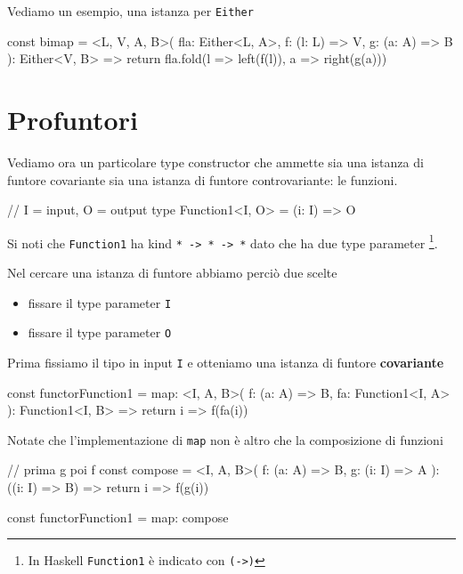 \documentclass[12pt]{article}
\theoremstyle{definition}
\newenvironment{code}
  {\vspace{0.5cm} \VerbatimEnvironment\begin{typescriptcode}}
  {\end{typescriptcode} \vspace{0.2cm}}
\begin{document}
Vediamo un esempio, una istanza per \texttt{Either}

\begin{code}
const bimap = <L, V, A, B>(
  fla: Either<L, A>,
  f: (l: L) => V,
  g: (a: A) => B
): Either<V, B> => {
  return fla.fold(l => left(f(l)), a => right(g(a)))
}
\end{code}

\newpage

\section{Profuntori}

Vediamo ora un particolare type constructor che ammette sia una istanza di funtore covariante sia una istanza di
funtore controvariante: le funzioni.

\begin{code}
// I = input, O = output
type Function1<I, O> = (i: I) => O
\end{code}

Si noti che \texttt{Function1} ha kind \texttt{* -> * -> *} dato che
ha due type parameter \footnote{In Haskell \texttt{Function1} è indicato con \texttt{(->)}}.

Nel cercare una istanza di funtore abbiamo perciò due scelte

\begin{itemize}
\item fissare il type parameter \texttt{I}
\item fissare il type parameter \texttt{O}
\end{itemize}

Prima fissiamo il tipo in input \texttt{I} e otteniamo una istanza di funtore \textbf{covariante}

\begin{code}
const functorFunction1 = {
  map: <I, A, B>(
    f: (a: A) => B,
    fa: Function1<I, A>
  ): Function1<I, B> => {
    return i => f(fa(i))
  }
}
\end{code}

Notate che l'implementazione di \texttt{map} non è altro che la composizione di funzioni

\begin{code}
// prima g poi f
const compose = <I, A, B>(
  f: (a: A) => B,
  g: (i: I) => A
): ((i: I) => B) => {
  return i => f(g(i))
}

const functorFunction1 = {
  map: compose
}
\end{code}
\end{document}
